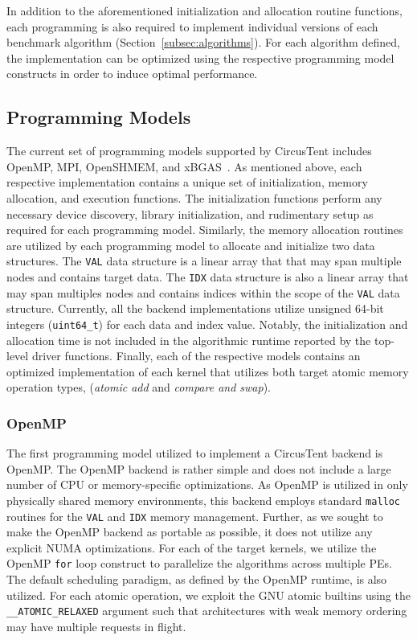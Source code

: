 In addition to the aforementioned initialization and allocation routine functions, each programming is also required to implement individual versions of each benchmark algorithm (Section~\ref{subsec:algorithms}).
For each algorithm defined, the implementation can be optimized using the respective programming model constructs in order to induce optimal performance.    


\subsection{Programming Models}
\label{subsec:programming_models}

The current set of programming models supported by CircusTent includes OpenMP, MPI, OpenSHMEM, and xBGAS~\cite{leidel2018xbgas}.
As mentioned above, each respective implementation contains a unique set of initialization, memory allocation, and execution functions.
The initialization functions perform any necessary device discovery, library initialization, and rudimentary setup as required for each programming model.
Similarly, the memory allocation routines are utilized by each programming model to allocate and initialize two data structures.
The \texttt{VAL} data structure is a linear array that that may span multiple nodes and contains target data.
The \texttt{IDX} data structure is also a linear array that may span multiples nodes and contains indices within the scope of the \texttt{VAL} data structure.
Currently, all the backend implementations utilize unsigned 64-bit integers (\texttt{uint64\_t}) for each data and index value.  
Notably, the initialization and allocation time is not included in the algorithmic runtime reported by the top-level driver functions.
Finally, each of the respective models contains an optimized implementation of each kernel that utilizes both target atomic memory operation types, (\textit{atomic add} and \textit{compare and swap}).

\subsubsection{OpenMP}
\label{subsubsec:openmp}

The first programming model utilized to implement a CircusTent backend is OpenMP.  
The OpenMP backend is rather simple and does not include a large number of CPU or memory-specific optimizations.
As OpenMP is utilized in only physically shared memory environments, this backend employs standard \texttt{malloc} routines for the \texttt{VAL} and \texttt{IDX} memory management.
Further, as we sought to make the OpenMP backend as portable as possible, it does not utilize any explicit NUMA optimizations. 
For each of the target kernels, we utilize the OpenMP \texttt{for} loop construct to parallelize the algorithms across multiple PEs.
The default scheduling paradigm, as defined by the OpenMP runtime, is also utilized.
For each atomic operation, we exploit the GNU atomic builtins using the \texttt{\_\_ATOMIC\_RELAXED} argument such that architectures with weak memory ordering may have multiple requests in flight.  

